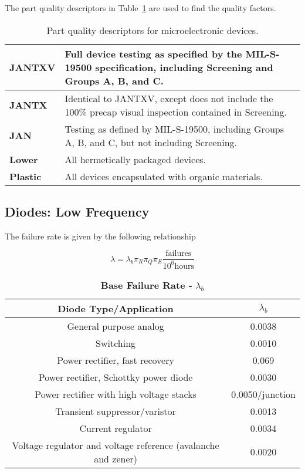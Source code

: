 The part quality descriptors in Table~\ref{table:partsQualityDescriptors} are used to find the quality
factors.

\begin{table}[h]
\caption{Part quality descriptors for microelectronic devices.}
\label{table:partsQualityDescriptors}
\begin{tabular}{|>{\columncolor{Gray}}l|m{10cm}|} \hline
\textbf{JANTXV} & 
Full device testing as specified by the MIL-S-19500 specification,
including Screening and Groups A, B, and C. \\ \hline
\textbf{JANTX} & Identical to JANTXV, except does not include the 100\%
precap visual inspection contained in Screening. \\ \hline
\textbf{JAN} & Testing as defined by MIL-S-19500, including Groups A, B,
and C, but not including Screening. \\ \hline
\textbf{Lower} & All hermetically packaged devices. \\ \hline
\textbf{Plastic} & All devices encapsulated with organic materials. \\ \hline
\end{tabular}
\end{table}

\newpage

\subsection{Diodes: Low Frequency}
\label{subsection:diodes-low-frequency}

The failure rate is given by the following relationship

$$\lambda = \lambda_{b} \pi_{R} \pi_{Q} \pi_{E} \frac{\text{failures}}{10^{6} \text{hours}}$$

\begin{table}[h]
\caption{\textbf{Base Failure Rate -} $\lambda_{b}$}
\label{table:baseFailRateDiodeLow}
\begin{tabular}{|c|c|} \hline
\rowcolor{Gray}
\textbf{Diode Type/Application} & $\lambda_{b}$ \\ \hline
General purpose analog & 0.0038 \\ \hline
Switching & 0.0010 \\ \hline
Power rectifier, fast recovery & 0.069 \\ \hline
Power rectifier, Schottky power diode & 0.0030 \\ \hline
Power rectifier with high voltage stacks & 0.0050/junction \\ \hline
Transient suppressor/varistor & 0.0013 \\ \hline
Current regulator & 0.0034 \\ \hline
Voltage regulator and voltage reference (avalanche and zener) &
0.0020 \\ \hline
\end{tabular}
\end{table}

